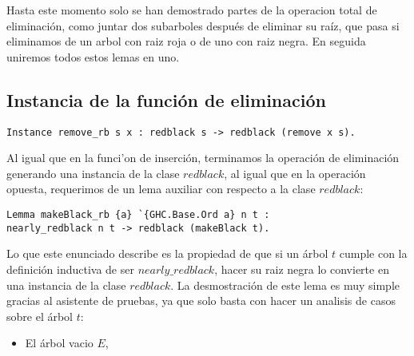 Hasta este momento solo se han demostrado partes de la operacion total de eliminación, como juntar
dos subarboles despu\'es de eliminar su ra\'iz, que pasa si eliminamos de un arbol con raiz roja o
de uno con raiz negra. En seguida uniremos todos estos lemas en uno.

\subsection{Instancia de la funci\'on de eliminaci\'on}
\begin{verbatim}
Instance remove_rb s x : redblack s -> redblack (remove x s).
\end{verbatim}

Al igual que en la funci'on de inserción, terminamos la operación de eliminaci\'on generando una
instancia de la clase $redblack$, al igual que en la operación opuesta, requerimos de un lema
auxiliar con respecto a la clase $redblack$:

\begin{verbatim}
Lemma makeBlack_rb {a} `{GHC.Base.Ord a} n t :
nearly_redblack n t -> redblack (makeBlack t).
\end{verbatim}

Lo que este enunciado describe es la propiedad de que si un \'arbol $t$ cumple con la definici\'on
inductiva de ser $nearly\_redblack$, hacer su raiz negra lo convierte en una instancia de la clase
$redblack$. La desmostraci\'on de este lema es muy simple gracias al asistente de pruebas, ya que
solo basta con hacer un analisis de casos sobre el \'arbol $t$:

\begin{itemize}
  \item El \'arbol vacio $E$, 
\end{itemize}

